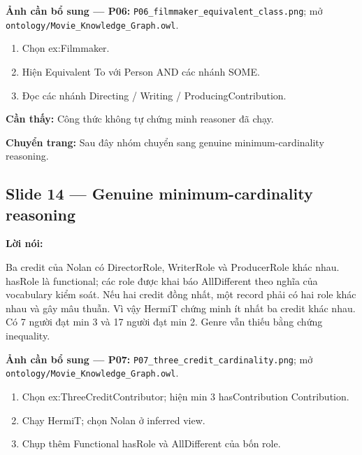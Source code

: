 \documentclass[
  11pt,
]{article}
\providecommand{\tightlist}{%
  \setlength{\itemsep}{0pt}\setlength{\parskip}{0pt}}
\begin{document}
\textbf{Ảnh cần bổ sung --- P06:}
\texttt{P06\_\allowbreak{}film\allowbreak{}maker\_\allowbreak{}eq\allowbreak{}uivalent\allowbreak{}\_\allowbreak{}class.\allowbreak{}p\allowbreak{}ng};
mở
\texttt{ontology\allowbreak{}/\allowbreak{}\allowbreak{}Movie\_\allowbreak{}\allowbreak{}K\allowbreak{}nowledge\allowbreak{}\_\allowbreak{}\allowbreak{}Graph.\allowbreak{}o\allowbreak{}wl}.

\begin{enumerate}
\def\labelenumi{\arabic{enumi}.}
\tightlist
\item
  Chọn ex:\allowbreak{}\allowbreak{}Filmm\allowbreak{}aker.\allowbreak{}
\item
  Hiện Equivalent To với Person AND các nhánh SOME.
\item
  Đọc các nhánh Directing / Writing /
  Producin\allowbreak{}g\allowbreak{}Contrib\allowbreak{}ution.\allowbreak{}
\end{enumerate}

\textbf{Cần thấy:} Công thức không tự chứng minh reasoner đã chạy.

\textbf{Chuyển trang:} Sau đây nhóm chuyển sang genuine
minimum-\allowbreak{}cardinal\allowbreak{}ity reasoning.

\subsection{\texorpdfstring{Slide 14 --- Genuine
minimum-\allowbreak{}cardinal\allowbreak{}ity
reasoning}{Slide 14 --- Genuine  reasoning}}\label{slide-14-genuine-minimum-cardinality-reasoning}

\textbf{Lời nói:}

Ba credit của Nolan có Director\allowbreak{}\allowbreak{}Role,
WriterRole và ProducerRole khác nhau. hasRole là functional; các role
được khai báo AllDifferent theo nghĩa của vocabulary kiểm soát. Nếu hai
credit đồng nhất, một record phải có hai role khác nhau và gây mâu
thuẫn. Vì vậy HermiT chứng minh ít nhất ba credit khác nhau. Có 7 người
đạt min 3 và 17 người đạt min 2. Genre vẫn thiếu bằng chứng inequality.

\textbf{Ảnh cần bổ sung --- P07:}
\texttt{P07\_\allowbreak{}thre\allowbreak{}e\_\allowbreak{}credit\allowbreak{}\_\allowbreak{}cardina\allowbreak{}lity.\allowbreak{}png\allowbreak{}};
mở
\texttt{ontology\allowbreak{}/\allowbreak{}\allowbreak{}Movie\_\allowbreak{}\allowbreak{}K\allowbreak{}nowledge\allowbreak{}\_\allowbreak{}\allowbreak{}Graph.\allowbreak{}o\allowbreak{}wl}.

\begin{enumerate}
\def\labelenumi{\arabic{enumi}.}
\tightlist
\item
  Chọn
  ex:\allowbreak{}\allowbreak{}Three\allowbreak{}\allowbreak{}Credit\allowbreak{}Co\allowbreak{}ntributo\allowbreak{}r;
  hiện min 3 has\allowbreak{}Contr\allowbreak{}ibution
  Contribu\allowbreak{}tion.\allowbreak{}
\item
  Chạy HermiT; chọn Nolan ở inferred view.
\item
  Chụp thêm Functional hasRole và AllDifferent của bốn role.
\end{enumerate}
\end{document}

